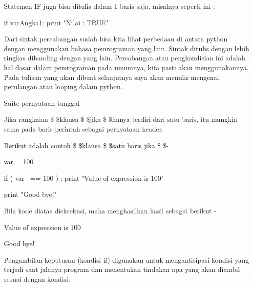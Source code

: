 \vspace{12pt}
\noindent 
Statemen IF juga bisa ditulis dalam 1 baris saja, misalnya seperti ini :  \par
\vspace{12pt}
\noindent 
if varAngka1: print "Nilai : TRUE" \par
\vspace{12pt}
\noindent 
Dari sintak percabangan sudah bisa kita lihat perbedaan di antara python dengan menggunakan bahasa pemrograman yang lain. Sintak ditulis dengan lebih ringkas dibanding dengan yang lain. Percabangan atau pengkondisian ini adalah hal dasar dalam pemrograman pada umumnya, kita pasti akan menggunakannya. Pada tulisan yang akan dibuat selanjutnya saya akan menulis mengenai perulangan atau looping dalam python. \par
\vspace{12pt}
\noindent 
Suite pernyataan tunggal \par
\vspace{12pt}
\noindent 
Jika rangkaian \$  \$klausa \$  \$jika \$  \$hanya terdiri dari satu baris, itu mungkin sama pada baris perintah sebagai pernyataan header. \par
\vspace{12pt}
\noindent 
Berikut adalah contoh \$  \$klausa \$  \$satu baris jika \$  \$- \par
\vspace{12pt}
\vspace{12pt}
\noindent 
var = 100 \par
\vspace{12pt}
\noindent 
if ( var~ == 100 ) : print "Value of expression is 100" \par
\vspace{12pt}
\noindent 
print "Good bye!" \par
\vspace{12pt}
\noindent 
Bila kode diatas dieksekusi, maka menghasilkan hasil sebagai berikut - \par
\vspace{12pt}
\noindent 
Value of expression is 100 \par
\vspace{12pt}
\noindent 
Good bye! \hspace*{1.31in}  \par
\noindent 
\vspace{12pt}
\noindent 
Pengambilan keputusan (kondisi if) digunakan untuk mengantisipasi kondisi yang terjadi saat jalanya program dan menentukan tindakan apa yang akan diambil sesuai dengan kondisi. \par
